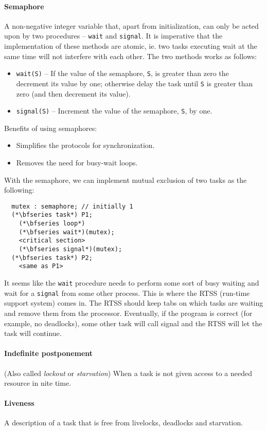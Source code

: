 \paragraph{Semaphore} A non-negative integer variable that, apart from initialization, can only be acted upon by two procedures -- \verb|wait| and \verb|signal|. It is imperative that the implementation of these methods are atomic, ie. two tasks executing wait at the same time will not interfere with each other. The two methods works as follows:
\begin{itemize}[nolistsep,noitemsep]
  \item \verb|wait(S)| -- If the value of the semaphore, \verb|S|, is greater than zero the decrement its value by one; otherwise delay the task until \verb|S| is greater than zero (and then decrement its value).
  \item \verb|signal(S)| -- Increment the value of the semaphore, \verb|S|, by one.
\end{itemize}

Benefits of using semaphores:
\begin{itemize}[nolistsep,noitemsep]
  \item Simplifies the protocols for synchronization.
  \item Removes the need for busy-wait loops.
\end{itemize}

With the semaphore, we can implement mutual exclusion of two tasks as the following:
\begin{lstlisting}
  mutex : semaphore; // initially 1
  (*\bfseries task*) P1;
    (*\bfseries loop*)
    (*\bfseries wait*)(mutex);
    <critical section>
    (*\bfseries signal*)(mutex);
  (*\bfseries task*) P2;
    <same as P1>
\end{lstlisting}

It seems like the \verb|wait| procedure needs to perform some sort of busy waiting and wait for a \verb|signal| from some other process. This is where the RTSS (run-time support system) comes in. The RTSS should keep tabs on which tasks are waiting and remove them from the processor. Eventually, if the program is correct (for example, no deadlocks), some other task will call signal and the RTSS will let the task will continue.

\paragraph{Indefinite postponement} (Also called \textit{lockout} or \textit{starvation}) When a task is not given access to a needed resource in  nite time.

\paragraph{Liveness} A description of a task that is free from livelocks, deadlocks and starvation.



